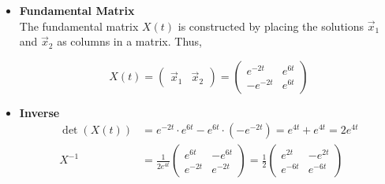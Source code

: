     \ifnum {} {\color{DarkBlue}   
    
    \begin{itemize}
        \item \textbf{Fundamental Matrix}\\
        The fundamental matrix \(X(t)\) is constructed by placing the solutions \(\vec{x}_1\) and \(\vec{x}_2\) as columns in a matrix. Thus,
        
        \[
        X(t) = \begin{pmatrix} \vec{x}_1 & \vec{x}_2 \end{pmatrix} = \begin{pmatrix} e^{-2t} & e^{6t} \\ -e^{-2t} & e^{6t} \end{pmatrix}
        \]
        \item \textbf{Inverse}\\
        \begin{align*}
            \det(X(t)) &= e^{-2t} \cdot e^{6t} - e^{6t} \cdot (-e^{-2t}) = e^{4t} + e^{4t} = 2e^{4t}\\
            X^{-1} &= \frac{1}{2e^{4t}} \begin{pmatrix} e^{6t} & -e^{6t} \\ e^{-2t} & e^{-2t} \end{pmatrix}
        = \frac{1}{2} \begin{pmatrix} e^{2t} & -e^{2t} \\ e^{-6t} & e^{-6t} \end{pmatrix}
        \end{align*}
        

\end{itemize}}
